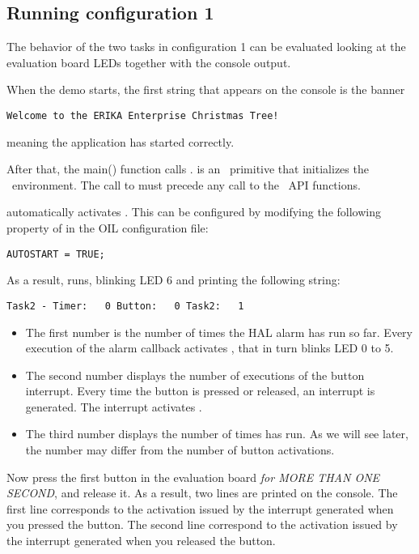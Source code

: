 \subsection{Running configuration 1}

The behavior of the two tasks in configuration 1 can be evaluated
looking at the evaluation board LEDs together with the console output.

When the demo starts, the first string that appears on the console is
the banner
\begin{lstlisting}
Welcome to the ERIKA Enterprise Christmas Tree!
\end{lstlisting}
meaning the application has started correctly.

After that, the main() function calls .  is
an \ee\ primitive that initializes the \ee\ environment. The call to
 must precede any call to the \ee\ API functions.

 automatically activates . This can be
configured by modifying the following property of  in the
OIL configuration file:

\begin{lstlisting}
AUTOSTART = TRUE;
\end{lstlisting}

As a result,  runs, blinking LED 6 and printing the following string:
\begin{lstlisting}
Task2 - Timer:   0 Button:   0 Task2:   1  
\end{lstlisting}

\begin{itemize}
\item The first number is the number of times the HAL alarm has run so
  far.  Every execution of the alarm callback activates , that in
  turn blinks LED 0 to 5.

\item The second number displays the number of executions of the
  button interrupt.  Every time the button is pressed or released, an
  interrupt is generated. The interrupt activates .
  
\item The third number displays the number of times  has
  run.  As we will see later, the number may differ from the number of
  button activations.
\end{itemize}

Now press the first button in the evaluation board {\em for MORE THAN
ONE SECOND}, and release it.  As a result, two lines are printed on
the console.  The first line corresponds to the  activation
issued by the interrupt generated when you pressed the button.  The
second line correspond to the  activation issued by the
interrupt generated when you released the button.

